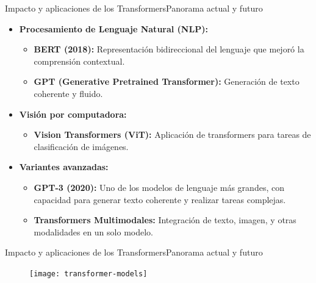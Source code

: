 \documentclass[10pt,border=3pt,tikz]{beamer}
\begin{document}
    \begin{frame}{Impacto y aplicaciones de los Transformers}{Panorama actual y futuro}
        \begin{itemize}
            \item \textbf{Procesamiento de Lenguaje Natural (NLP):} 
            \begin{itemize}
                \item \textbf{BERT (2018):} Representación bidireccional del lenguaje que mejoró la comprensión contextual.
                \item \textbf{GPT (Generative Pretrained Transformer):} Generación de texto coherente y fluido.
            \end{itemize}
            \item \textbf{Visión por computadora:} 
            \begin{itemize}
                \item \textbf{Vision Transformers (ViT):} Aplicación de transformers para tareas de clasificación de imágenes.
            \end{itemize}
            \item \textbf{Variantes avanzadas:} 
            \begin{itemize}
                \item \textbf{GPT-3 (2020):} Uno de los modelos de lenguaje más grandes, con capacidad para generar texto coherente y realizar tareas complejas.
                \item \textbf{Transformers Multimodales:} Integración de texto, imagen, y otras modalidades en un solo modelo.
            \end{itemize}
        \end{itemize}
    \end{frame}
    
    \begin{frame}{Impacto y aplicaciones de los Transformers}{Panorama actual y futuro}
        \begin{figure}
            \centering
            \texttt{[image: transformer-models]}
        \end{figure}
    \end{frame}
    
\end{document}
